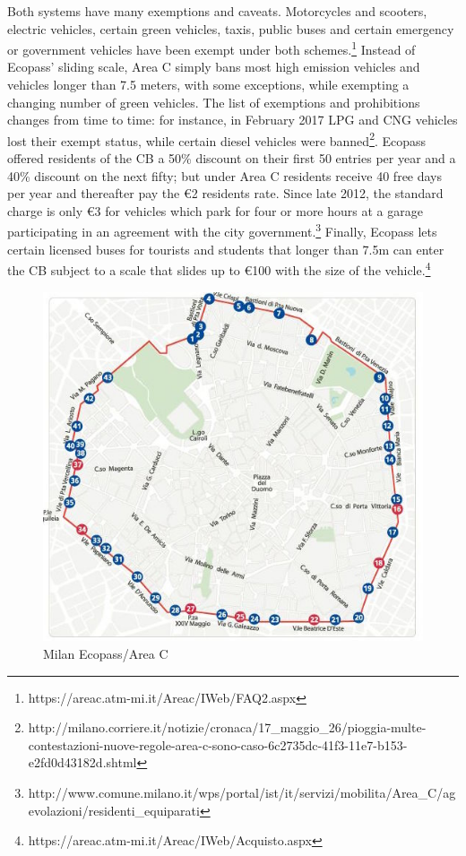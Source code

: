 Both systems have many exemptions and caveats. Motorcycles and scooters, electric vehicles, certain green vehicles, taxis, public buses and certain emergency or government vehicles have been exempt under both schemes.\footnote{https://areac.atm-mi.it/Areac/IWeb/FAQ2.aspx} Instead of Ecopass' sliding scale, Area C simply bans most high emission vehicles and vehicles longer than 7.5 meters, with some exceptions, while exempting a changing number of green vehicles. The list of exemptions and prohibitions changes from time to time: for instance, in February 2017 LPG and CNG vehicles lost their exempt status, while certain diesel vehicles were banned\footnote{http://milano.corriere.it/notizie/cronaca/17\_maggio\_26/pioggia-multe-contestazioni-nuove-regole-area-c-sono-caso-6c2735dc-41f3-11e7-b153-e2fd0d43182d.shtml}. Ecopass offered residents of the CB a 50\% discount on their first 50 entries per year and a 40\% discount on the next fifty; but under Area C residents receive 40 free days per year and thereafter pay the \euro 2 residents rate. Since late 2012, the standard charge is only \euro3 for vehicles which park for four or more hours at a garage participating in an agreement with the city government.\footnote{http://www.comune.milano.it/wps/portal/ist/it/servizi/mobilita/Area\_C/agevolazioni/residenti\_equiparati} Finally, Ecopass lets certain licensed buses for tourists and students that longer than 7.5m can enter the CB subject to a scale that slides up to \euro 100 with the size of the vehicle.\footnote{https://areac.atm-mi.it/Areac/IWeb/Acquisto.aspx}

\begin{figure}[ht]
	\includegraphics[width=.8\textwidth]{../img/milan-map.jpg}
	\caption{Milan Ecopass/Area C \citep{Rotaris2010}}
	\label{fig:milan-map}
\end{figure}

